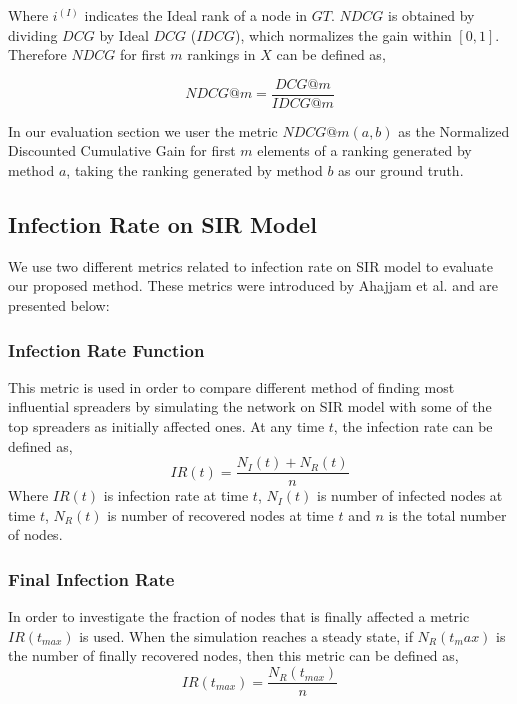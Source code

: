 \documentclass[sigconf]{acmart}
\begin{document}
Where $i^{(I)}$ indicates the Ideal rank of a node in $GT$. $NDCG$ is obtained by dividing $DCG$ by Ideal $DCG$ ($IDCG$), which normalizes the gain within $[0,1]$. Therefore $NDCG$ for first  $m$ rankings in $X$ can be defined as,
	
\begin{equation}
NDCG@m = \frac{DCG@m}{IDCG@m}
\end{equation}

In our evaluation section we user the metric $NDCG@m(a,b)$ as the Normalized Discounted Cumulative Gain for first $m$ elements of a ranking generated by method $a$, taking the ranking generated by method $b$ as our ground truth.

\subsection{Infection Rate on SIR Model}
We use two different metrics related to infection rate on SIR model to evaluate our proposed method. These metrics were introduced by Ahajjam et al. \cite{ahajjam2018identification} and are presented below:

\subsubsection{Infection Rate Function}
This metric is used in order to compare different method of finding most influential spreaders by simulating the network on SIR model with some of the top spreaders as initially affected ones. At any time $t$, the infection rate can be defined as,
\begin{equation}
IR(t) = \dfrac{N_I(t)+N_R(t)}{n}
\label{infection rate eq}
\end{equation}
Where $IR(t)$ is infection rate at time $t$, $N_I(t)$ is number of infected nodes at time $t$, $N_R(t)$ is number of recovered nodes at time $t$ and $n$ is the total number of nodes.
 
\subsubsection{Final Infection Rate}
In order to investigate the fraction of nodes that is finally affected a metric $IR(t_{max})$ is used. When the simulation reaches a steady state, if $N_R(t_max)$ is the number of finally recovered nodes, then this metric can be defined as,
\begin{equation}
IR(t_{max}) = \dfrac{N_R(t_{max})}{n}
\label{infection rate eq}
\end{equation}
\end{document}
